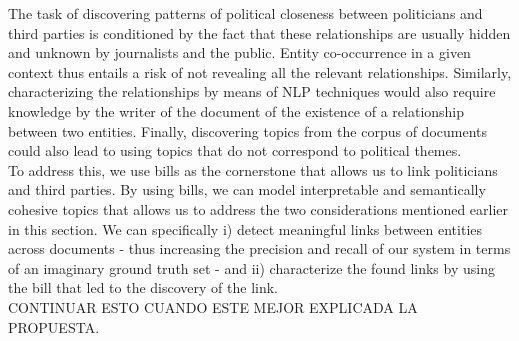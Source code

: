 The task of discovering patterns of political closeness between politicians and third parties is conditioned by the fact that these relationships are usually hidden and unknown by journalists and the public. Entity co-occurrence in a given context thus entails a risk of not revealing all the relevant relationships. Similarly, characterizing the relationships by means of NLP techniques would also require knowledge by the writer of the document of the existence of a relationship between two entities. Finally, discovering topics from the corpus of documents could also lead to using topics that do not correspond to political themes. \\

To address this, we use bills as the cornerstone that allows us to link politicians and third parties. By using bills, we can model interpretable and semantically cohesive topics that allows us to address the two considerations mentioned earlier in this section. We can specifically i) detect meaningful links between entities across documents - thus increasing the precision and recall of our system in terms of an imaginary ground truth set - and ii) characterize the found links by using the bill that led to the discovery of the link.\\ 

CONTINUAR ESTO CUANDO ESTE MEJOR EXPLICADA LA PROPUESTA.
